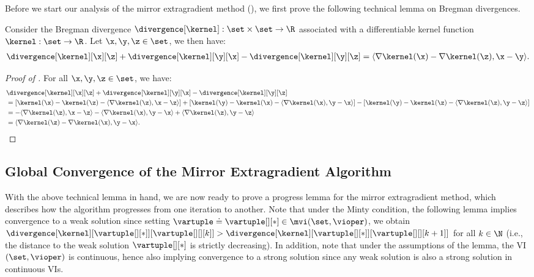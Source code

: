 Before we start our analysis of the mirror extragradient method (), we first prove the following technical lemma on Bregman divergences.

\begin{lemma}\label{lemma:bregman_triangle}
    Consider the Bregman divergence $\divergence[\kernel]: \set \times \set \to \R$ associated with a differentiable kernel function $\kernel: \set \to \R$. Let $\x, \y, \z \in \set$, we then have:
    \begin{align}
        \divergence[\kernel][\x][\z] + \divergence[\kernel][\y][\x] - \divergence[\kernel][\y][\z] = \langle \nabla \kernel(\x) - \nabla \kernel(\z), \x - \y \rangle.
    \end{align}
\end{lemma}

\begin{proof}[Proof of ]

For all $\x, \y, \z \in \set$, we have:
\begin{align*}
& \divergence[\kernel][\x][\z] + \divergence[\kernel][\y][\x] - \divergence[\kernel][\y][\z]\\
&= \left[\kernel(\x) - \kernel(\z) - \langle \nabla \kernel(\z), \x - \z \rangle \right] +  \left[\kernel(\y) - \kernel(\x) - \langle \nabla \kernel(\x), \y - \x \rangle \right]
- \left[ \kernel(\y) - \kernel(\z) - \langle \nabla \kernel(\z), \y - \z \rangle \right]\\
&= - \langle \nabla \kernel(\z), \x - \z \rangle  - \langle \nabla \kernel(\x), \y - \x \rangle
+ \langle \nabla \kernel(\z), \y - \z \rangle\\
&= \langle \nabla \kernel(\z) - \nabla \kernel(\x), \y - \x \rangle.
\end{align*}
\end{proof}


\subsection{Global Convergence of the Mirror Extragradient Algorithm}

With the above technical lemma in hand, we are now ready to prove a progress lemma for the mirror extragradient method, which describes how the algorithm progresses from one iteration to another. Note that under the Minty condition, the following lemma implies  convergence to a weak solution since setting $\vartuple \doteq \vartuple[][*] \in \mvi(\set, \vioper)$, we obtain $\divergence[\kernel][{\vartuple[][*]}][{\vartuple[][][k]}] > \divergence[\kernel][{\vartuple[][*]}][{\vartuple[][][k + 1]}]$ for all $k \in \N$ (i.e., the distance to the weak solution $\vartuple[][*]$ is strictly decreasing). In addition, note that under the assumptions of the lemma, the VI $(\set, \vioper)$ is continuous, hence also implying convergence to a strong solution since any weak solution is also a strong solution in continuous VIs.

